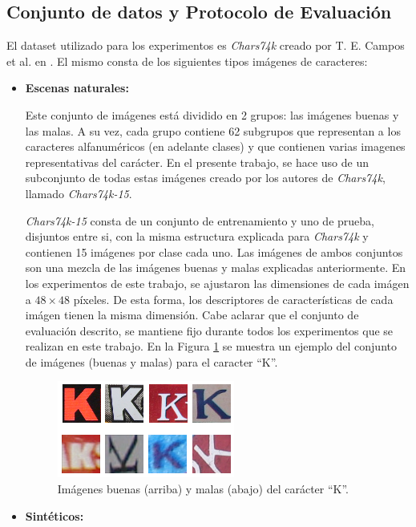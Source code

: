 \subsection{Conjunto de datos y Protocolo de Evaluación}
\label{subsection:evaluacion}


	El dataset utilizado para los experimentos es \textit{Chars74k} creado por T. E. Campos et al. en \cite{dCBV09}. El mismo consta de los siguientes tipos imágenes de caracteres: 
	\begin{itemize}
		\item \textbf{Escenas naturales:}
		
		Este conjunto de imágenes está dividido en 2 grupos: las imágenes buenas y las malas. A su vez, cada grupo contiene 62 subgrupos que representan a los caracteres alfanuméricos (en adelante clases) y que contienen varias imagenes representativas del carácter. En el presente trabajo, se hace uso de un subconjunto de todas estas imágenes creado por los autores de \textit{Chars74k}, llamado \textit{Chars74k-15}.
		
		\textit{Chars74k-15} consta de un conjunto de entrenamiento y uno de prueba, disjuntos entre si, con la misma estructura explicada para \textit{Chars74k} y contienen 15 imágenes por clase cada uno. Las imágenes de ambos conjuntos son una mezcla de las imágenes buenas y malas explicadas anteriormente. En los experimentos de este trabajo, se ajustaron las dimensiones de cada imágen a $48 \times 48$ píxeles. De esta forma, los descriptores de características de cada imágen tienen la misma dimensión. Cabe aclarar que el conjunto de evaluación descrito, se mantiene fijo durante todos los experimentos que se realizan en este trabajo. En la Figura \ref{fig: chars74k-reales} se muestra un ejemplo del conjunto de imágenes (buenas y malas) para el caracter ``K''.
		\begin{figure}[htbp]
			\centering
				\includegraphics[scale=1]{img/img_buenas_malas.png}
				\caption[Chars74k reales]{Imágenes buenas (arriba) y malas (abajo) del carácter ``K''.}
			\label{fig: chars74k-reales}
		\end{figure}	
		
	\item \textbf{Sintéticos:}
	

\end{itemize}
